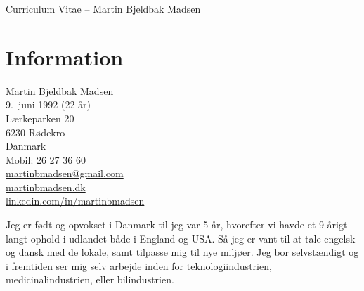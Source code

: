 \documentclass[margin,line,a4paper]{resume}
\begin{document}
\raggedright
{\sc \Large Curriculum Vitae -- Martin Bjeldbak Madsen}
\begin{resume}
    \vspace{0.5cm}
    \begin{figure}
         \vspace{-1cm}
        \begin{center}
        \end{center}
         \vspace{-2cm}
    \end{figure}

    \section{\mysidestyle Information}%
    Martin Bjeldbak Madsen\\
    9.\ juni 1992 (22 år)\\ 
    Lærkeparken 20\\
    6230 Rødekro\\
    Danmark\\
    Mobil: 26 27 36 60\\
    \href{mailto:martinbmadsen@gmail.com}{martinbmadsen@gmail.com}\\
    \href{http://martinbmadsen.dk}{martinbmadsen.dk}\\
    \href{http://dk.linkedin.com/in/martinbmadsen}{linkedin.com/in/martinbmadsen}
    \vspace{1cm}

    Jeg er født og opvokset i Danmark til jeg var 5 år, hvorefter vi havde et
    9-årigt langt ophold i udlandet både i England og USA. Så jeg er
    vant til at tale engelsk og dansk med de lokale, samt tilpasse mig
    til nye miljøer. Jeg bor selvstændigt og i fremtiden ser mig selv
    arbejde inden for teknologiindustrien, medicinalindustrien, eller
    bilindustrien.


\end{resume}
\end{document}
